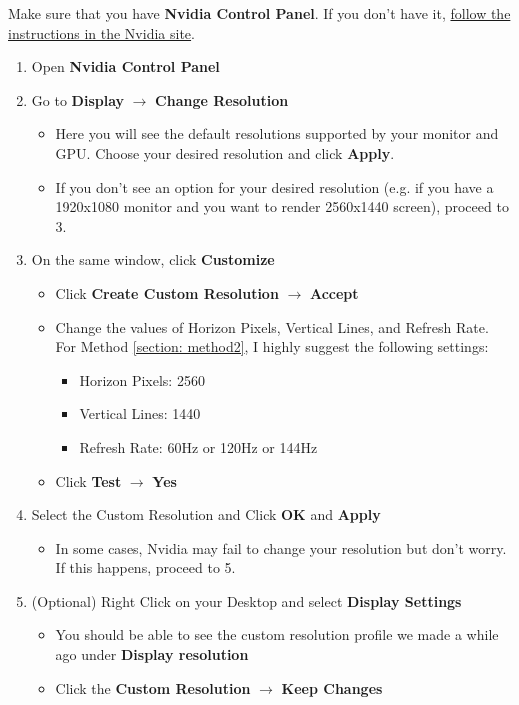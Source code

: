 \documentclass{article}
\begin{document}
Make sure that you have \textbf{Nvidia Control Panel}. If you don't have it, \href{https://www.geforce.com/drivers}{follow the instructions in the Nvidia site}.
\begin{enumerate}
   \item Open \textbf{Nvidia Control Panel}
   \item Go to \textbf{Display} $\rightarrow$ \textbf{Change Resolution}
   \begin{itemize}
     \item Here you will see the default resolutions supported by your monitor and GPU. Choose your desired resolution and click \textbf{Apply}. 
     \item If you don't see an option for your desired resolution (e.g. if you have a 1920x1080 monitor and you want to render 2560x1440 screen), proceed to 3.
   \end{itemize}
   \item On the same window, click \textbf{Customize}
   \begin{itemize}
     \item Click \textbf{Create Custom Resolution} $\rightarrow$ \textbf{Accept}
     \item Change the values of Horizon Pixels, Vertical Lines, and Refresh Rate. For Method \ref{section: method2}, I highly suggest the following settings:
     \begin{itemize}
         \item Horizon Pixels: 2560
         \item Vertical Lines: 1440
         \item Refresh Rate: 60Hz or 120Hz or 144Hz
     \end{itemize}
     \item Click \textbf{Test} $\rightarrow$ \textbf{Yes}
   \end{itemize}
   \item Select the Custom Resolution and Click \textbf{OK} and \textbf{Apply}
   \begin{itemize}
     \item In some cases, Nvidia may fail to change your resolution but don't worry. If this happens, proceed to 5.
   \end{itemize}
   \item (Optional) Right Click on your Desktop and select \textbf{Display Settings}
   \begin{itemize}
     \item You should be able to see the custom resolution profile we made a while ago under \textbf{Display resolution}
     \item Click the \textbf{Custom Resolution} $\rightarrow$ \textbf{Keep Changes}
   \end{itemize}
 
\end{enumerate}
\end{document}
